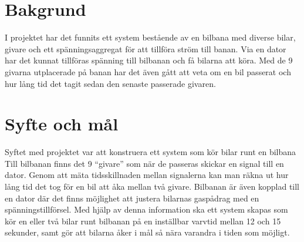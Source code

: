 \section{Bakgrund}
I projektet har det funnits ett system bestående av en bilbana med diverse bilar, givare och ett spänningsaggregat för att tillföra ström till banan. Via en dator har det kunnat tillföras spänning till bilbanan och få bilarna att köra. Med de 9 givarna utplacerade på banan har det även gått att veta om en bil passerat och hur lång tid det tagit sedan den senaste passerade givaren.

\section{Syfte och mål}
Syftet med projektet var att konstruera ett system som kör bilar runt en bilbana
Till bilbanan finns det 9 ``givare'' som när
de passeras skickar en signal till en dator. Genom att mäta tidsskillnaden
mellan signalerna kan man räkna ut hur lång tid det tog för en bil att åka
mellan två givare. Bilbanan är även kopplad till en dator där det finns
möjlighet att justera bilarnas gaspådrag med en spänningstillförsel. Med hjälp
av denna information ska ett system skapas som kör en eller två bilar runt
bilbanan på en inställbar varvtid mellan 12 och 15 sekunder, samt gör att
bilarna åker i mål så nära varandra i tiden som möjligt.
